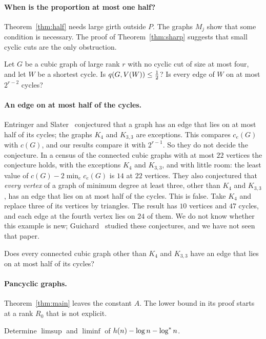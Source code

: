 \paragraph{When is the proportion at most one half?}
Theorem~\ref{thm:half} needs large girth outside $P$. The graphs $M_j$ show that some condition is
necessary. The proof of Theorem~\ref{thm:sharp} suggests that small cyclic cuts are the only
obstruction.

\begin{problem}
Let $G$ be a cubic graph of large rank $r$ with no cyclic cut of size at most four, and let $W$ be
a shortest cycle. Is $q(G,V(W))\le\tfrac12$? Is every edge of $W$ on at most $2^{r-2}$ cycles?
\end{problem}

\paragraph{An edge on at most half of the cycles.}
Entringer and Slater~\cite{ES} conjectured that a graph has an edge that lies on at most half of
its cycles; the graphs $K_4$ and $K_{3,3}$ are exceptions. This compares $c_e(G)$ with $c(G)$, and
our results compare it with $2^{r-1}$. So they do not decide the conjecture. In a census of the connected
cubic graphs with at most $22$ vertices the conjecture holds, with the exceptions $K_4$ and
$K_{3,3}$, and with little room: the least value of $c(G)-2\min_ec_e(G)$ is $14$ at $22$ vertices.
They also conjectured that \emph{every vertex} of a graph of minimum degree at least three, other
than $K_4$ and $K_{3,3}$, has an edge that lies on at most half of the cycles. This is false. Take
$K_4$ and replace three of its vertices by triangles. The result has $10$ vertices and $47$ cycles,
and each edge at the fourth vertex lies on $24$ of them. We do not know whether this example is
new; Guichard~\cite{Guichard} studied these conjectures, and we have not seen that paper.

\begin{problem}
Does every connected cubic graph other than $K_4$ and $K_{3,3}$ have an edge that lies on at most
half of its cycles?
\end{problem}

\paragraph{Pancyclic graphs.}
Theorem~\ref{thm:main} leaves the constant $A$. The lower bound in its proof starts at a rank
$R_0$ that is not explicit.

\begin{problem}
Determine $\limsup$ and $\liminf$ of $h(n)-\log n-\log^{*} n$.
\end{problem}
